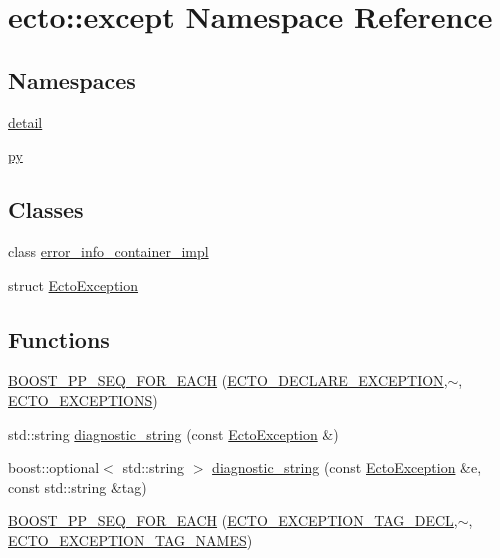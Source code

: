 \hypertarget{namespaceecto_1_1except}{\section{ecto\-:\-:except Namespace Reference}
\label{namespaceecto_1_1except}
}
\subsection*{Namespaces}
\begin{DoxyCompactItemize}
\item 
\hyperlink{namespaceecto_1_1except_1_1detail}{detail}
\item 
\hyperlink{namespaceecto_1_1except_1_1py}{py}
\end{DoxyCompactItemize}
\subsection*{Classes}
\begin{DoxyCompactItemize}
\item 
class \hyperlink{classecto_1_1except_1_1error__info__container__impl}{error\-\_\-info\-\_\-container\-\_\-impl}
\item 
struct \hyperlink{structecto_1_1except_1_1EctoException}{Ecto\-Exception}
\end{DoxyCompactItemize}
\subsection*{Functions}
\begin{DoxyCompactItemize}
\item 
\hyperlink{namespaceecto_1_1except_a6ed4b851e67551e870e933f85628cb6f}{B\-O\-O\-S\-T\-\_\-\-P\-P\-\_\-\-S\-E\-Q\-\_\-\-F\-O\-R\-\_\-\-E\-A\-C\-H} (\hyperlink{except_8hpp_a9b77695b9c45c36934e7c890ce6f682f}{E\-C\-T\-O\-\_\-\-D\-E\-C\-L\-A\-R\-E\-\_\-\-E\-X\-C\-E\-P\-T\-I\-O\-N},$\sim$, \hyperlink{except_8hpp_ad3bbab1baffa25e20db0635270c5f108}{E\-C\-T\-O\-\_\-\-E\-X\-C\-E\-P\-T\-I\-O\-N\-S})
\item 
std\-::string \hyperlink{namespaceecto_1_1except_a8161938bf962eaf02d9b0e73b80a5c4a}{diagnostic\-\_\-string} (const \hyperlink{structecto_1_1except_1_1EctoException}{Ecto\-Exception} \&)
\item 
boost\-::optional$<$ std\-::string $>$ \hyperlink{namespaceecto_1_1except_ae56832eeac0c3e23f11c197a8f5a6971}{diagnostic\-\_\-string} (const \hyperlink{structecto_1_1except_1_1EctoException}{Ecto\-Exception} \&e, const std\-::string \&tag)
\item 
\hyperlink{namespaceecto_1_1except_a8744cfe3c8d4364696873aeb175c68b9}{B\-O\-O\-S\-T\-\_\-\-P\-P\-\_\-\-S\-E\-Q\-\_\-\-F\-O\-R\-\_\-\-E\-A\-C\-H} (\hyperlink{except_8hpp_a4a4f231e4fe0f923cd9ee3a48803ca30}{E\-C\-T\-O\-\_\-\-E\-X\-C\-E\-P\-T\-I\-O\-N\-\_\-\-T\-A\-G\-\_\-\-D\-E\-C\-L},$\sim$, \hyperlink{except_8hpp_a6a632b3827deba566cbca48b37bf53e2}{E\-C\-T\-O\-\_\-\-E\-X\-C\-E\-P\-T\-I\-O\-N\-\_\-\-T\-A\-G\-\_\-\-N\-A\-M\-E\-S})
\end{DoxyCompactItemize}


